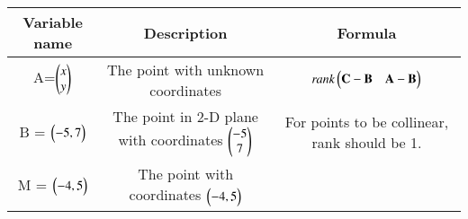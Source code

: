 \begin{center}
	\begin{tabular}{|c|c|c|}
    \hline
    \textbf{Variable name} & \textbf{Description} & \textbf{Formula}\\ 
    \hline
		A=$\begin{pmatrix}x\\ y\end{pmatrix}$ & The point with unknown coordinates & $\emph{rank}\begin{pmatrix} \mathbf{C}-\mathbf{B} & \mathbf{A} - \mathbf{B} \end{pmatrix}$ \\
    \hline 
		B = $\begin{pmatrix}-5,7\end{pmatrix}$ & The point in 2-D plane with coordinates $\begin{pmatrix}-5 \\ 7\end{pmatrix}$ & For points to be collinear, rank should be 1. \\
    \hline
		M = $\begin{pmatrix}-4,5\end{pmatrix}$ & The point with coordinates $\begin{pmatrix}-4, 5\end{pmatrix}$ &  \\
    \hline   
    \end{tabular}
\end{center}
